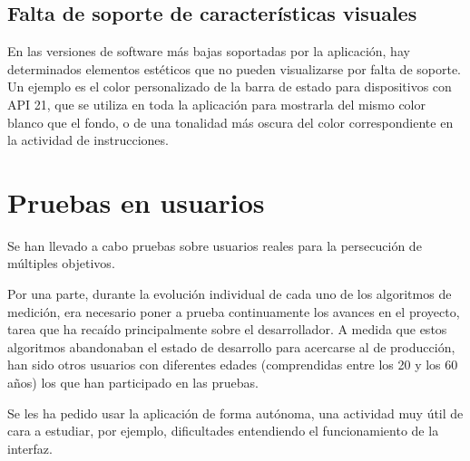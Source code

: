 \subsection{Falta de soporte de características visuales}

En las versiones de software más bajas soportadas por la aplicación, hay determinados elementos estéticos que no pueden visualizarse por falta de soporte. Un ejemplo es el color personalizado de la barra de estado para dispositivos con API 21, que se utiliza en toda la aplicación para mostrarla del mismo color blanco que el fondo, o de una tonalidad más oscura del color correspondiente en la actividad de instrucciones.

\section{Pruebas en usuarios}

Se han llevado a cabo pruebas sobre usuarios reales para la persecución de múltiples objetivos. 

Por una parte, durante la evolución individual de cada uno de los algoritmos de medición, era necesario poner a prueba continuamente los avances en el proyecto, tarea que ha recaído principalmente sobre el desarrollador. A medida que estos algoritmos abandonaban el estado de desarrollo para acercarse al de producción, han sido otros usuarios con diferentes edades (comprendidas entre los 20 y los 60 años) los que han participado en las pruebas.

Se les ha pedido usar la aplicación de forma autónoma, una actividad muy útil de cara a estudiar, por ejemplo, dificultades entendiendo el funcionamiento de la interfaz.

